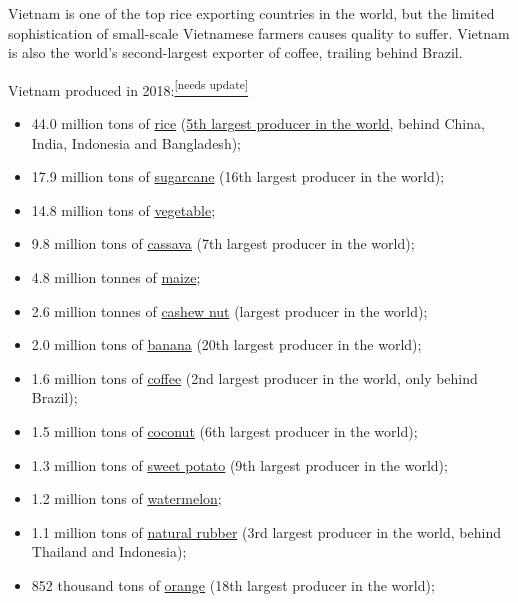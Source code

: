 \documentclass[openany]{book}
\begin{document}
Vietnam is one of the top rice exporting countries in the world, but the limited sophistication of small-scale Vietnamese farmers causes quality to suff\-er.\cite{65} Vietnam is also the world's second-largest exporter of coffee, trailing behind Brazil.\cite{66}

Vietnam produced in 2018:\cite{67}\href{https://en.wikipedia.org/wiki/Wikipedia:Manual_of_Style/Dates_and_numbers#Chronological_items}{\textsuperscript{[needs update]}}

\begin{itemize}
    \item 44.0 million tons of \href{https://en.wikipedia.org/wiki/Rice}{rice} (\href{https://en.wikipedia.org/wiki/Rice_production_in_Vietnam}{5th largest producer in the world}, behind China, India, Indonesia and Bangladesh);
    \item 17.9 million tons of \href{https://en.wikipedia.org/wiki/Sugarcane}{sugarcane} (16th largest producer in the world);
    \item 14.8 million tons of \href{https://en.wikipedia.org/wiki/Vegetable}{vegetable};
    \item 9.8 million tons of \href{https://en.wikipedia.org/wiki/Cassava}{cassava} (7th largest producer in the world);
    \item 4.8 million tonnes of \href{https://en.wikipedia.org/wiki/Maize}{maize};
    \item 2.6 million tonnes of \href{https://en.wikipedia.org/wiki/Cashew_nut}{cashew nut} (largest producer in the world);
    \item 2.0 million tons of \href{https://en.wikipedia.org/wiki/Banana}{banana} (20th largest producer in the world);
    \item 1.6 million tons of \href{https://en.wikipedia.org/wiki/Coffee}{coffee} (2nd largest producer in the world, only behind Brazil);
    \item 1.5 million tons of \href{https://en.wikipedia.org/wiki/Coconut}{coconut} (6th largest producer in the world);
    \item 1.3 million tons of \href{https://en.wikipedia.org/wiki/Sweet_potato}{sweet potato} (9th largest producer in the world);
    \item 1.2 million tons of \href{https://en.wikipedia.org/wiki/Watermelon}{watermelon};
    \item 1.1 million tons of \href{https://en.wikipedia.org/wiki/Natural_rubber}{natural rubber} (3rd largest producer in the world, behind Thailand and Indonesia);
    \item 852 thousand tons of \href{https://en.wikipedia.org/wiki/Orange_(fruit)}{orange} (18th largest producer in the world);

\end{itemize}
\end{document}

